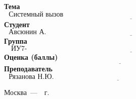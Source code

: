 \begin{titlepage}
	\noindent\textbf{Тема} $\underline{\text{~~Системный вызов open.~~~~~~~~~~~~~~~~~~~~~~~~~~~~~~~~~~~~~~~~~~~~~~~~~~~~~~~~~~~~~~~~~~~~~~~~~~~~~~~~~}}$\newline\newline
	\noindent\textbf{Студент} $\underline{\text{~~Авсюнин А. А.~~~~~~~~~~~~~~~~~~~~~~~~~~~~~~~~~~~~~~~~~~~~~~~~~~~~~~~~~~~~~~~~~~~~~~~~~~~~~~~~~~~~~~~~}}$\newline\newline
	\noindent\textbf{Группа} $\underline{\text{~~~ИУ7-66Б~~~~~~~~~~~~~~~~~~~~~~~~~~~~~~~~~~~~~~~~~~~~~~~~~~~~~~~~~~~~~~~~~~~~~~~~~~~~~~~~~~~~~~~~~~~~~~~~~}}$\newline\newline
	\noindent\textbf{Оценка (баллы)} $\underline{\text{~~~~~~~~~~~~~~~~~~~~~~~~~~~~~~~~~~~~~~~~~~~~~~~~~~~~~~~~~~~~~~~~~~~~~~~~~~~~~~~~~~~~~~~~~~~~~~~~~~~}}$\newline\newline
	\noindent\textbf{Преподаватель} $\underline{\text{~~Рязанова Н.Ю.~~~~~~~~~~~~~~~~~~~~~~~~~~~~~~~~~~~~~~~~~~~~~~~~~~~~~~~~~~~~~~~~~~~~~~~~~~~~}}$\newline

	\begin{center}
		\vfill
		Москва~---~\the\year~г.
	\end{center}
	\restoregeometry
\end{titlepage}

